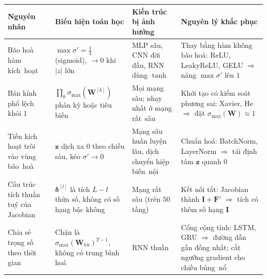 \begin{table}[H]
\centering
\begin{captionaboveboxaivn}
\end{captionaboveboxaivn}
\renewcommand{\arraystretch}{1.25}\small
\begin{tabularx}{\linewidth}{@{}
  >{\raggedright\arraybackslash\hsize=0.80\hsize}X
  >{\raggedright\arraybackslash\hsize=1.15\hsize}X
  >{\raggedright\arraybackslash\hsize=0.85\hsize}X
  >{\raggedright\arraybackslash\hsize=1.20\hsize}X @{}}
\toprule
\rowcolor{rowLavender}
\textbf{Nguyên nhân} & \textbf{Biểu hiện toán học} &
\textbf{Kiến trúc bị ảnh hưởng} & \textbf{Nguyên lý khắc phục} \\
\midrule
Bão hoà hàm kích~hoạt &
$\max\sigma' = \tfrac14$ (sigmoid), $\to 0$ khi $|z|$ lớn &
MLP sâu, CNN đời đầu, RNN dùng $\tanh$ &
Thay bằng hàm không bão hoà: ReLU, LeakyReLU, GELU $\Rightarrow$ nâng
$\max\sigma'$ lên $1$ \\
\addlinespace[3pt]
Bán kính phổ lệch khỏi $1$ &
$\textstyle\prod_{k}\sigma_{\max}(\mathbf{W}^{[k]})$ phân kỳ hoặc tiêu biến &
Mọi mạng sâu; nhạy nhất ở mạng rất~sâu &
Khởi tạo có kiểm soát phương sai: Xavier, He $\Rightarrow$ đặt
$\sigma_{\max}(\mathbf{W})\approx1$ \\
\addlinespace[3pt]
Tiền kích hoạt trôi vào vùng bão~hoà &
$\mathbf{z}$ dịch xa $0$ theo chiều sâu, kéo $\sigma'\to0$ &
Mạng sâu huấn luyện lâu, dịch chuyển hiệp biến~nội &
Chuẩn hoá: BatchNorm, LayerNorm $\Rightarrow$ tái định tâm $\mathbf{z}$ quanh $0$ \\
\addlinespace[3pt]
Cấu trúc tích thuần tuý của Jacobian &
$\boldsymbol{\delta}^{[l]}$ là tích $L-l$ thừa số, không có số hạng bậc không &
Mạng rất sâu (trên $50$ tầng) &
Kết nối tắt: Jacobian thành $\mathbf{I}+\mathbf{F}'$ $\Rightarrow$ tích có
thêm số hạng $\mathbf{I}$ \\
\addlinespace[3pt]
Chia sẻ trọng số theo thời gian &
Chặn là $\sigma_{\max}(\mathbf{W}_{hh})^{T-1}$, không có trung bình hoá &
RNN thuần &
Cổng cộng tính: LSTM, GRU $\Rightarrow$ đường dẫn gần đồng nhất; cắt ngưỡng
gradient cho chiều bùng~nổ \\
\bottomrule
\end{tabularx}
\end{table}

